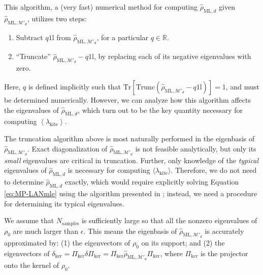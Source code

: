 \documentclass[aps,pra, twocolumn]{revtex4-1}
\newcommand{\M}{\mathcal{M}}
\newcommand{\Tr}{\mathrm{Tr}}
\newcommand{\Id}{\mathbb{I}}
\newcommand{\expect}[1]{\ensuremath{\left\langle#1\right\rangle}}
\def\Id{1\!\mathrm{l}}
\newcommand{\rhohat}{\hat{\rho}}
\newcommand{\rhoML}[1]{\rhohat_{\scriptscriptstyle{\mathrm{ML},#1}}}
\begin{document}
This algorithm, a (very fast) numerical method for computing $\rhoML{d}$ given $\rhoML{\M'_{d}}$, utilizes two steps:
\begin{enumerate}[noitemsep]
\item Subtract $q\Id$ from $\rhoML{\M'_{d}}$, for a particular $q \in \mathbb{R}$.
\item ``Truncate'' $\rhoML{\M'_{d}}-q\Id$, by replacing each of its negative eigenvalues with zero.
\end{enumerate}
Here, $q$ is defined implicitly such that $\Tr\left[ \mathrm{Trunc}(\rhoML{\M'_{d}}-q\Id)\right] = 1$, and must be determined numerically.
However, we can analyze how this algorithm affects the eigenvalues of $\rhoML{d}$, which turn out to be the key quantity necessary for computing $\expect{\lambda_{\mathrm{kite}}}$.

The truncation algorithm above is most naturally performed in the eigenbasis of $\rhoML{\M'_{d}}$.  Exact diagonalization of $\rhoML{\M'_{d}}$ is not feasible analytically, but only its \emph{small} eigenvalues are critical in truncation. Further, only knowledge of the \emph{typical} eigenvalues of $\rhoML{d}$ is necessary for computing $\langle \lambda_{\mathrm{kite}}\rangle$. Therefore, we do not need to determine $\rhoML{d}$ exactly, which would require explicitly solving Equation \eqref{eq:MP-LANmle} using the algorithm presented in \cite{Smolin2012}; instead, we need a procedure for determining its typical eigenvalues.

We assume that $N_{\mathrm{samples}}$ is sufficiently large so that all the nonzero eigenvalues of $\rho_0$ are much larger than $\epsilon$. This means the eigenbasis of $\rhoML{\M'_{d}}$ is accurately approximated by: (1) 
the eigenvectors of $\rho_0$ on its support; and (2) the eigenvectors of $\delta_{\mathrm{ker}} = \Pi_{\mathrm{ker}}\delta\Pi_{\mathrm{ker}} = \Pi_{\mathrm{ker}}\rhoML{\M'_{d}}\Pi_{\mathrm{ker}}$, where $\Pi_{\mathrm{ker}}
$ is the projector onto the kernel of $\rho_0$.
\end{document}
